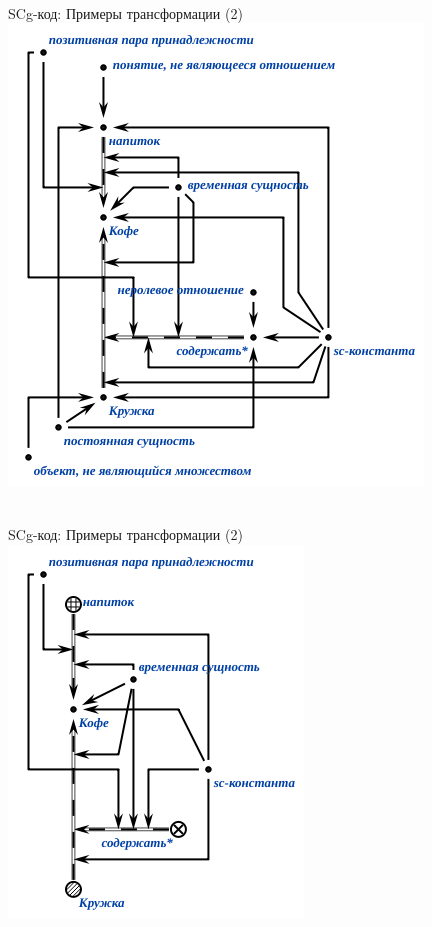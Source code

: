 \begin{frame}{\\SCg-код: Примеры трансформации (2)}
	\topline
	\justifying
	\vspace*{\fill}\\
	\vspace{10mm}
	\centering
	\includegraphics[scale=0.5]{./figures/intro/scg/examples/scg_examples_transf_2_1.png}
\end{frame}

\begin{frame}{\\SCg-код: Примеры трансформации (2)}
	\topline
	\justifying
	\vspace*{\fill}\\
	\vspace{10mm}
	\centering
	\includegraphics[scale=0.5]{./figures/intro/scg/examples/scg_examples_transf_2_2.png}
\end{frame}


